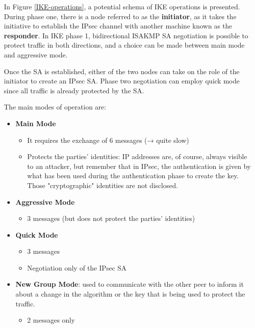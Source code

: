 In Figure \ref{IKE-operations}, a potential schema of IKE operations is presented. During phase one, there is a node referred to as the \textbf{initiator}, as it takes the initiative to establish the IPsec channel with another machine known as the \textbf{responder}. In IKE phase 1, bidirectional ISAKMP SA negotiation is possible to protect traffic in both directions, and a choice can be made between main mode and aggressive mode.

Once the SA is established, either of the two nodes can take on the role of the initiator to create an IPsec SA. Phase two negotiation can employ quick mode since all traffic is already protected by the SA.

The main modes of operation are:

\begin{itemize}
    \item \textbf{Main Mode}
          \begin{itemize}
              \item It requires the exchange of 6 messages (→ quite slow)
              \item Protects the parties' identities: IP addresses are, of course, always visible to an attacker, but remember that in IPsec, the authentication is given by what has been used during the authentication phase to create the key. Those "cryptographic" identities are not disclosed.
          \end{itemize}

    \item \textbf{Aggressive Mode}
          \begin{itemize}
              \item 3 messages (but does not protect the parties' identities)
          \end{itemize}

    \item \textbf{Quick Mode}
          \begin{itemize}
              \item 3 messages
              \item Negotiation only of the IPsec SA
          \end{itemize}

    \item \textbf{New Group Mode}: used to communicate with the other peer to inform it about a change in the algorithm or the key that is being used to protect the traffic.
          \begin{itemize}
              \item 2 messages only
          \end{itemize}
\end{itemize}

